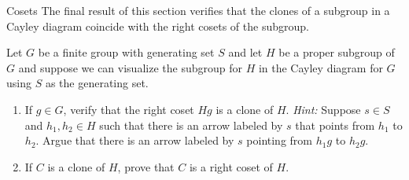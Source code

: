 \begin{section}{Cosets}
The final result of this section verifies that the clones of a subgroup in a Cayley diagram coincide with the right cosets of the subgroup.

\begin{problem}\label{prob:RightCosetsClones}
Let $G$ be a finite group with generating set $S$ and let $H$ be a proper subgroup of $G$ and suppose we can visualize the subgroup for $H$ in the Cayley diagram for $G$ using $S$ as the generating set. 
\begin{enumerate}[label=\textrm{(\alph*)}]
\item If $g\in G$, verify that the right coset $Hg$ is a clone of $H$. \emph{Hint:} Suppose $s\in S$ and $h_1, h_2\in H$ such that there is an arrow labeled by $s$ that points from $h_1$ to $h_2$.  Argue that there is an arrow labeled by $s$ pointing from $h_1g$ to $h_2g$.
\item If $C$ is a clone of $H$, prove that $C$ is a right coset of $H$.
\end{enumerate}
\end{problem}

\end{section}

